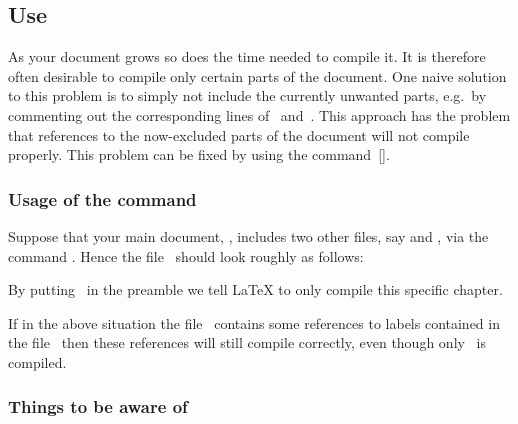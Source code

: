 \subsection{Use }

As your document grows so does the time needed to compile it.
It is therefore often desirable to compile only certain parts of the document.
One naive solution to this problem is to simply not include the currently unwanted parts, e.g.\ by commenting out the corresponding lines of~ and~.
This approach has the problem that references to the now-excluded parts of the document will not compile properly.
This problem can be fixed by using the command~[\comname].

\subsubsection{Usage of the command}

Suppose that your main document, , includes two other files, say  and , via the command .
Hence the file~ should look roughly as follows:
By putting~ in the preamble we tell {\LaTeX} to only compile this specific chapter.
If in the above situation the file~ contains some references to labels contained in the file~ then these references will still compile correctly, even though only~ is compiled.

\subsubsection{Things to be aware of}

